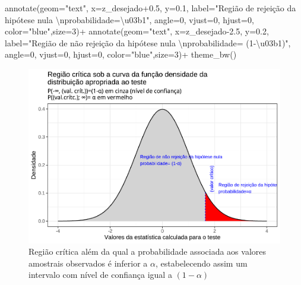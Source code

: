 \documentclass[
]{book}
\newenvironment{Shaded}{\begin{snugshade}}{\end{snugshade}}
\newcommand{\AttributeTok}[1]{\textcolor[rgb]{0.77,0.63,0.00}{#1}}
\newcommand{\DecValTok}[1]{\textcolor[rgb]{0.00,0.00,0.81}{#1}}
\newcommand{\FloatTok}[1]{\textcolor[rgb]{0.00,0.00,0.81}{#1}}
\newcommand{\FunctionTok}[1]{\textcolor[rgb]{0.00,0.00,0.00}{#1}}
\newcommand{\NormalTok}[1]{#1}
\newcommand{\SpecialCharTok}[1]{\textcolor[rgb]{0.00,0.00,0.00}{#1}}
\newcommand{\StringTok}[1]{\textcolor[rgb]{0.31,0.60,0.02}{#1}}
\begin{document}
\begin{Shaded}
\begin{Highlighting}[]
\FunctionTok{annotate}\NormalTok{(}\AttributeTok{geom=}\StringTok{"text"}\NormalTok{, }\AttributeTok{x=}\NormalTok{z\_desejado}\FloatTok{+0.5}\NormalTok{, }\AttributeTok{y=}\FloatTok{0.1}\NormalTok{, }\AttributeTok{label=}\StringTok{"Região de rejeição da hipótese nula }\SpecialCharTok{\textbackslash{}n}\StringTok{probabilidade=\textbackslash{}u03b1"}\NormalTok{, }\AttributeTok{angle=}\DecValTok{0}\NormalTok{, }\AttributeTok{vjust=}\DecValTok{0}\NormalTok{, }\AttributeTok{hjust=}\DecValTok{0}\NormalTok{, }\AttributeTok{color=}\StringTok{"blue"}\NormalTok{,}\AttributeTok{size=}\DecValTok{3}\NormalTok{)}\SpecialCharTok{+}
  \FunctionTok{annotate}\NormalTok{(}\AttributeTok{geom=}\StringTok{"text"}\NormalTok{, }\AttributeTok{x=}\NormalTok{z\_desejado}\FloatTok{{-}2.5}\NormalTok{, }\AttributeTok{y=}\FloatTok{0.2}\NormalTok{, }\AttributeTok{label=}\StringTok{"Região de não rejeição da hipótese nula }\SpecialCharTok{\textbackslash{}n}\StringTok{probabilidade= (1{-}\textbackslash{}u03b1)"}\NormalTok{, }\AttributeTok{angle=}\DecValTok{0}\NormalTok{, }\AttributeTok{vjust=}\DecValTok{0}\NormalTok{, }\AttributeTok{hjust=}\DecValTok{0}\NormalTok{, }\AttributeTok{color=}\StringTok{"blue"}\NormalTok{,}\AttributeTok{size=}\DecValTok{3}\NormalTok{)}\SpecialCharTok{+}
  \FunctionTok{theme\_bw}\NormalTok{()}
\end{Highlighting}
\end{Shaded}

\begin{figure}

{\centering \includegraphics[width=1\linewidth]{apostila_files/figure-latex/fig72-1} 

}

\caption{Região crítica além da qual a probabilidade associada aos valores amostrais observados é inferior a $\alpha$, estabelecendo assim um intervalo com nível de confiança igual a $(1-\alpha)$}\label{fig:fig72}
\end{figure}
\end{document}
